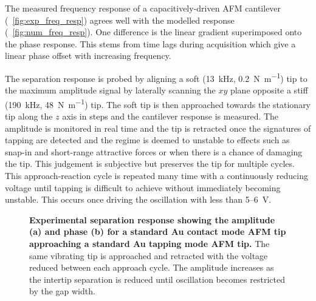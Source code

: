 \documentclass{article}
\begin{document}
The measured frequency response of a capacitively-driven AFM cantilever (\figurename~\ref{fig:exp_freq_resp}) agrees well with the modelled response (\figurename~\ref{fig:num_freq_resp}). One difference is the linear gradient superimposed onto the phase response. This stems from time lags during acquisition which give a linear phase offset with increasing frequency.

The separation response is probed by aligning a soft (\SI{13}{kHz}, \SI{0.2}{N\per\metre}) tip to the maximum amplitude signal by laterally scanning the $xy$ plane opposite a stiff (\SI{190}{kHz}, \SI{48}{N\per\metre}) tip. The soft tip is then approached towards the stationary tip along the $z$ axis in  steps and the cantilever response is measured. The amplitude is monitored in real time and the tip is retracted once the signatures of tapping are detected and the regime is deemed to unstable to effects such as snap-in and short-range attractive forces or when there is a chance of damaging the tip. This judgement is subjective but preserves the tip for multiple cycles. This approach-reaction cycle is repeated many time with a continuously reducing voltage until tapping is difficult to achieve without immediately becoming unstable. This occurs once driving the oscillation with less than 5--\SI{6}{V}.

\begin{figure}[h]
\centering
{}
{\caption[Experimental separation response showing the amplitude (a) and phase (b) for a standard Au contact mode AFM tip approaching a standard Au tapping mode AFM tip]{\textbf{Experimental separation response showing the amplitude (a) and phase (b) for a standard Au contact mode AFM tip approaching a standard Au tapping mode AFM tip.} The same vibrating tip is approached and retracted with the voltage reduced between each approach cycle. The amplitude increases as the intertip separation is reduced until oscillation becomes restricted by the gap width.}
\label{fig:exp_sep_resp}}
\end{figure}
\end{document}

